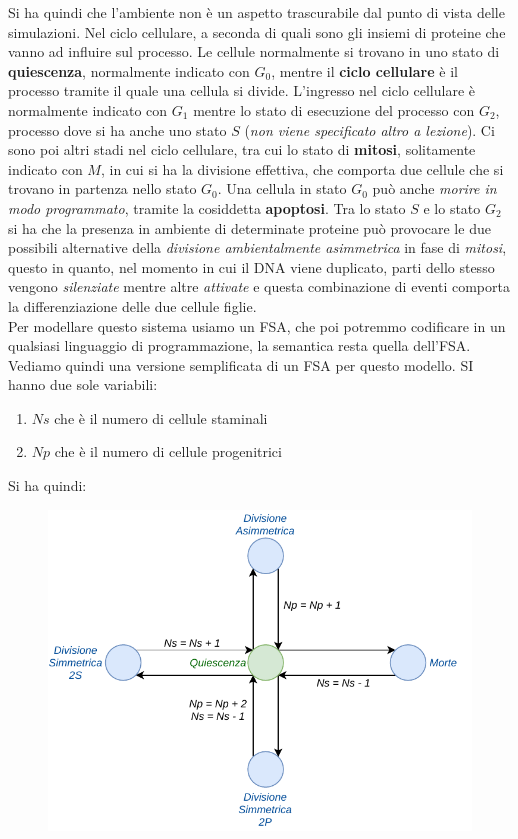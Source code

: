 \documentclass[a4paper,12pt, oneside]{book}
\begin{document}
Si ha quindi che l'ambiente non è un aspetto trascurabile dal punto di vista
delle simulazioni. Nel ciclo cellulare, a seconda di quali sono gli insiemi di
proteine che vanno ad influire sul processo. Le cellule normalmente si trovano
in uno stato di \textbf{quiescenza}, normalmente indicato con $G_0$, mentre il
\textbf{ciclo cellulare} è il processo tramite il quale una cellula si
divide. L'ingresso nel ciclo cellulare è normalmente indicato con $G_1$ mentre
lo stato di esecuzione del processo con $G_2$, processo dove si ha anche uno
stato $S$ (\textit{non viene specificato altro a lezione}). Ci sono poi altri
stadi nel 
ciclo cellulare, tra cui lo stato di \textbf{mitosi}, solitamente indicato con
$M$, in cui si ha la divisione effettiva, che comporta due cellule che si
trovano in partenza nello stato $G_0$. Una cellula in stato $G_0$ può anche
\textit{morire in modo programmato}, tramite la cosiddetta
\textbf{apoptosi}. Tra lo stato $S$ e lo stato $G_2$ si ha che la presenza in
ambiente di determinate proteine può provocare le due possibili alternative
della \textit{divisione ambientalmente asimmetrica} in fase di
\textit{mitosi}, questo in quanto, nel momento in cui il DNA viene duplicato,
parti dello stesso vengono \textit{silenziate} mentre altre \textit{attivate} e
questa combinazione di eventi comporta la differenziazione delle due cellule
figlie.\\ 
Per modellare questo sistema usiamo un FSA, che poi potremmo codificare in un
qualsiasi linguaggio di programmazione, la semantica resta quella dell'FSA.\\
Vediamo quindi una versione semplificata di un FSA per questo modello. SI hanno
due sole variabili:
\begin{enumerate}
  \item $Ns$ che è il numero di cellule staminali
  \item $Np$ che è il numero di cellule progenitrici
\end{enumerate}
Si ha quindi:
\begin{figure}[H]
  \centering
  \includegraphics[scale = 1]{img/fsa1.pdf}
  \label{fig:fsa1}
\end{figure}
\end{document}
